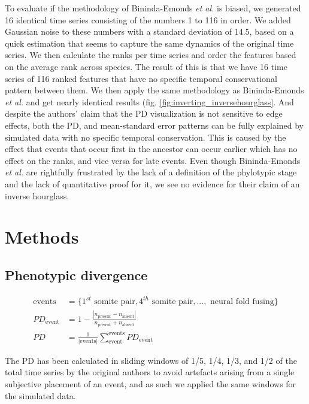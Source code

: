 To evaluate if the methodology of Bininda-Emonds \textit{et al.} is biased, we generated 16 identical time series consisting of the numbers 1 to 116 in order. We added Gaussian noise to these numbers with a standard deviation of 14.5, based on a quick estimation that seems to capture the same dynamics of the original time series. We then calculate the ranks per time series and order the features based on the average rank across species. The result of this is that we have 16 time series of 116 ranked features that have no specific temporal conservational pattern between them. We then apply the same methodology as Bininda-Emonds \textit{et al.} and get nearly identical results (fig. \ref{fig:inverting_inversehourglass}. And despite the authors' claim that the PD visualization is not sensitive to edge effects, both the PD, and mean-standard error patterns can be fully explained by simulated data with no specific temporal conservation. This is caused by the effect that events that occur first in the ancestor can occur earlier which has no effect on the ranks, and vice versa for late events. Even though Bininda-Emonds \textit{et al.} are rightfully frustrated by the lack of a definition of the phylotypic stage and the lack of quantitative proof for it, we see no evidence for their claim of an inverse hourglass. 

\newpage
\section{Methods}

\subsection{Phenotypic divergence}

\begin{align*}\label{eq:phenotypicdivergence}
    \text{events} &= \{1^{st}\text{ somite pair}, 4^{th}\text{ somite pair}, ...,\text{ neural fold fusing}\} \\ 
    PD_{\text{event}} &= 1 - \frac{|n_{\text{present}} - n_{\text{absent}}|}{n_{\text{present}} + n_{\text{absent}}} \\
    PD &= \frac{1}{|\text{events}|} \sum_{\text{event}}^{\text{events}} PD_{\text{event}}
\end{align*}

The PD has been calculated in sliding windows of 1/5, 1/4, 1/3, and 1/2 of the total time series by the original authors to avoid artefacts arising from a single subjective placement of an event, and as such we applied the same windows for the simulated data.

